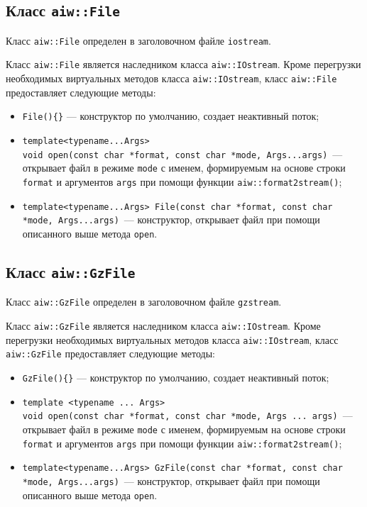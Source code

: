 \subsection{Класс {\tt aiw::File}}
Класс \verb'aiw::File' определен в заголовочном файле \verb'iostream'.

Класс \verb'aiw::File' является наследником класса \verb'aiw::IOstream'. Кроме перегрузки необходимых
виртуальных методов класса \verb'aiw::IOstream', класс \verb'aiw::File' предоставляет следующие методы:
\begin{itemize}
\item \verb'File(){}' --- конструктор по умолчанию, создает неактивный поток;
\item \verb'template<typename...Args>'\\\verb'void open(const char *format, const char *mode, Args...args)'~---
  открывает файл в режиме \verb'mode' с именем, формируемым на основе строки \verb'format' и аргументов \verb'args'
  при помощи функции  \verb'aiw::format2stream()';
\item \verb'template<typename...Args> File(const char *format, const char *mode, Args...args)'~---
  конструктор, открывает файл при помощи описанного выше метода \verb'open'.
\end{itemize}

\subsection{Класс {\tt aiw::GzFile}}
Класс \verb'aiw::GzFile' определен в заголовочном файле \verb'gzstream'.

Класс \verb'aiw::GzFile' является наследником класса \verb'aiw::IOstream'. Кроме перегрузки необходимых
виртуальных методов класса \verb'aiw::IOstream', класс \verb'aiw::GzFile' предоставляет следующие методы:
\begin{itemize}
\item \verb'GzFile(){}' --- конструктор по умолчанию, создает неактивный поток;
\item \verb'template <typename ... Args>'\\\verb'void open(const char *format, const char *mode, Args ... args)'~---
  открывает файл в режиме \verb'mode' с именем, формируемым на основе строки \verb'format' и аргументов \verb'args'
  при помощи функции  \verb'aiw::format2stream()';
\item \verb'template<typename...Args> GzFile(const char *format, const char *mode, Args...args)'~---
  конструктор, открывает файл при помощи описанного выше метода \verb'open'.
\end{itemize}

